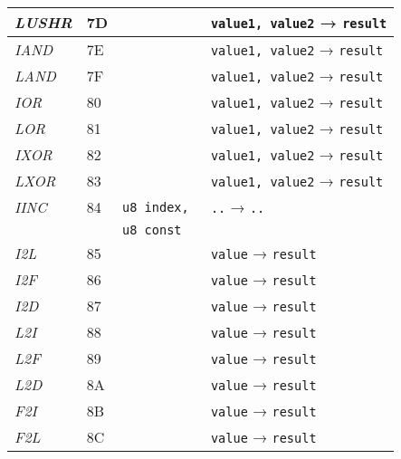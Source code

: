 \begin{center}
\begin{longtable}{ | p{} | p{} | p{} | p{} | }
        \emph{LUSHR}
		& 7D & & \lstinline|value1, value2| → \lstinline|result|
		\\ \hline

        \emph{IAND}
		& 7E & & \lstinline|value1, value2| → \lstinline|result|
		\\ \hline

        \emph{LAND}
		& 7F & & \lstinline|value1, value2| → \lstinline|result|
		\\ \hline

        \emph{IOR}
		& 80 & & \lstinline|value1, value2| → \lstinline|result|
		\\ \hline

        \emph{LOR}
		& 81 & & \lstinline|value1, value2| → \lstinline|result|
		\\ \hline

        \emph{IXOR}
		& 82 & & \lstinline|value1, value2| → \lstinline|result|
		\\ \hline

        \emph{LXOR}
		& 83 & & \lstinline|value1, value2| → \lstinline|result|
		\\ \hline

        \emph{IINC}
		& 84 & \lstinline|u8 index, | & \lstinline|..| → \lstinline|..| \\
        & & \lstinline|u8 const| &
		\\ \hline

        \emph{I2L}
		& 85 & & \lstinline|value| → \lstinline|result|
		\\ \hline

        \emph{I2F}
		& 86 & & \lstinline|value| → \lstinline|result|
		\\ \hline

        \emph{I2D}
		& 87 & & \lstinline|value| → \lstinline|result|
		\\ \hline

        \emph{L2I}
		& 88 & & \lstinline|value| → \lstinline|result|
		\\ \hline

        \emph{L2F}
		& 89 & & \lstinline|value| → \lstinline|result|
		\\ \hline

        \emph{L2D}
		& 8A & & \lstinline|value| → \lstinline|result|
		\\ \hline

        \emph{F2I}
		& 8B & & \lstinline|value| → \lstinline|result|
		\\ \hline

        \emph{F2L}
		& 8C & & \lstinline|value| → \lstinline|result|
		\\ \hline


\end{longtable}
\end{center}
